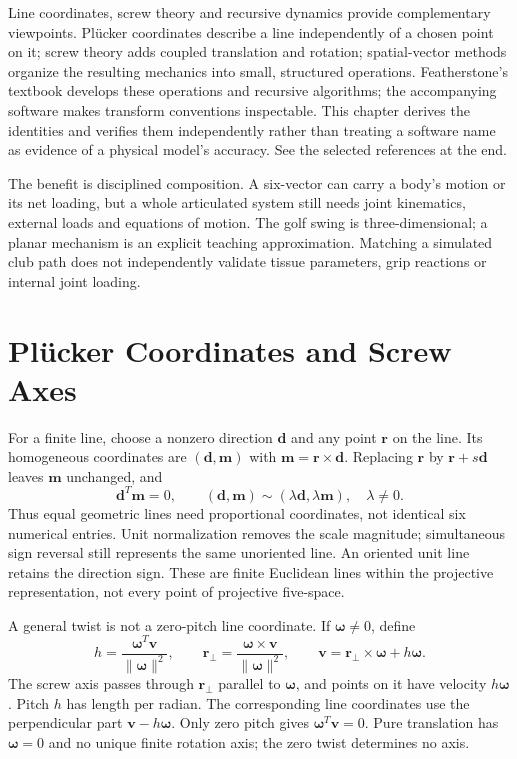 Line coordinates, screw theory and recursive dynamics provide complementary viewpoints. Pl\"ucker coordinates describe a line independently of a chosen point on it; screw theory adds coupled translation and rotation; spatial-vector methods organize the resulting mechanics into small, structured operations. Featherstone's textbook develops these operations and recursive algorithms; the accompanying software makes transform conventions inspectable. This chapter derives the identities and verifies them independently rather than treating a software name as evidence of a physical model's accuracy. See the selected references at the end.

The benefit is disciplined composition. A six-vector can carry a body's motion or its net loading, but a whole articulated system still needs joint kinematics, external loads and equations of motion. The golf swing is three-dimensional; a planar mechanism is an explicit teaching approximation. Matching a simulated club path does not independently validate tissue parameters, grip reactions or internal joint loading.

\section{Pl\"ucker Coordinates and Screw Axes}
\label{sec:plucker}
\label{def:plucker_def}

For a finite line, choose a nonzero direction $\mathbf d$ and any point $\mathbf r$ on the line. Its homogeneous coordinates are $(\mathbf d,\mathbf m)$ with $\mathbf m=\mathbf r\times\mathbf d$. Replacing $\mathbf r$ by $\mathbf r+s\mathbf d$ leaves $\mathbf m$ unchanged, and
\begin{equation}
\mathbf d^T\mathbf m=0,\qquad
(\mathbf d,\mathbf m)\sim(\lambda\mathbf d,\lambda\mathbf m),\quad\lambda\ne0.
\end{equation}
Thus equal geometric lines need proportional coordinates, not identical six numerical entries. Unit normalization removes the scale magnitude; simultaneous sign reversal still represents the same unoriented line. An oriented unit line retains the direction sign. These are finite Euclidean lines within the projective representation, not every point of projective five-space.

A general twist is not a zero-pitch line coordinate. If $\boldsymbol\omega\ne0$, define
\begin{equation}
h=\frac{\boldsymbol\omega^T\mathbf v}{\|\boldsymbol\omega\|^2},\qquad
\mathbf r_\perp=\frac{\boldsymbol\omega\times\mathbf v}{\|\boldsymbol\omega\|^2},\qquad
\mathbf v=\mathbf r_\perp\times\boldsymbol\omega+h\boldsymbol\omega.
\end{equation}
The screw axis passes through $\mathbf r_\perp$ parallel to $\boldsymbol\omega$, and points on it have velocity $h\boldsymbol\omega$. Pitch $h$ has length per radian. The corresponding line coordinates use the perpendicular part $\mathbf v-h\boldsymbol\omega$. Only zero pitch gives $\boldsymbol\omega^T\mathbf v=0$. Pure translation has $\boldsymbol\omega=0$ and no unique finite rotation axis; the zero twist determines no axis.

